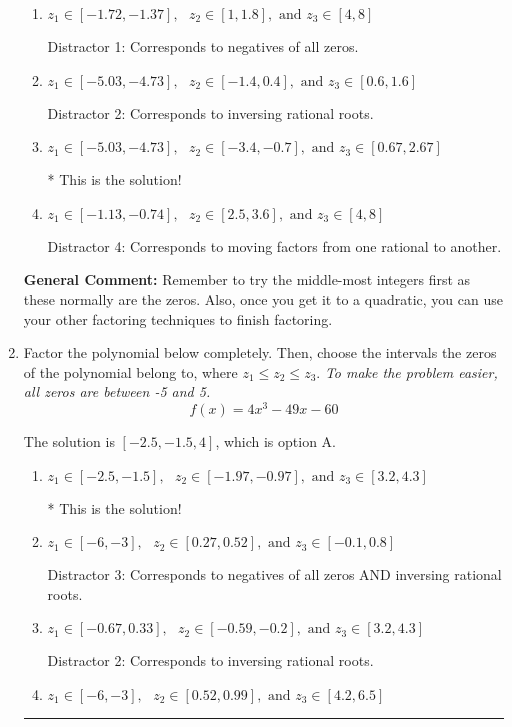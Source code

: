 \documentclass{extbook}[14pt]
\newcommand{\litem}[1]{\item #1

\rule{\textwidth}{0.4pt}}
\begin{document}
\begin{enumerate}
{\begin{enumerate}[label=\Alph*.]
 Distractor 3: Corresponds to negatives of all zeros AND inversing rational roots.
\item \( z_1 \in [-1.72, -1.37], \text{   }  z_2 \in [1, 1.8], \text{   and   } z_3 \in [4, 8] \)

 Distractor 1: Corresponds to negatives of all zeros.
\item \( z_1 \in [-5.03, -4.73], \text{   }  z_2 \in [-1.4, 0.4], \text{   and   } z_3 \in [0.6, 1.6] \)

 Distractor 2: Corresponds to inversing rational roots.
\item \( z_1 \in [-5.03, -4.73], \text{   }  z_2 \in [-3.4, -0.7], \text{   and   } z_3 \in [0.67, 2.67] \)

* This is the solution!
\item \( z_1 \in [-1.13, -0.74], \text{   }  z_2 \in [2.5, 3.6], \text{   and   } z_3 \in [4, 8] \)

 Distractor 4: Corresponds to moving factors from one rational to another.
\end{enumerate}

\textbf{General Comment:} Remember to try the middle-most integers first as these normally are the zeros. Also, once you get it to a quadratic, you can use your other factoring techniques to finish factoring.
}
\litem{
Factor the polynomial below completely. Then, choose the intervals the zeros of the polynomial belong to, where $z_1 \leq z_2 \leq z_3$. \textit{To make the problem easier, all zeros are between -5 and 5.}
\[ f(x) = 4x^{3} -49 x -60 \]

The solution is \( [-2.5, -1.5, 4] \), which is option A.\begin{enumerate}[label=\Alph*.]
\item \( z_1 \in [-2.5, -1.5], \text{   }  z_2 \in [-1.97, -0.97], \text{   and   } z_3 \in [3.2, 4.3] \)

* This is the solution!
\item \( z_1 \in [-6, -3], \text{   }  z_2 \in [0.27, 0.52], \text{   and   } z_3 \in [-0.1, 0.8] \)

 Distractor 3: Corresponds to negatives of all zeros AND inversing rational roots.
\item \( z_1 \in [-0.67, 0.33], \text{   }  z_2 \in [-0.59, -0.2], \text{   and   } z_3 \in [3.2, 4.3] \)

 Distractor 2: Corresponds to inversing rational roots.
\item \( z_1 \in [-6, -3], \text{   }  z_2 \in [0.52, 0.99], \text{   and   } z_3 \in [4.2, 6.5] \)


\end{enumerate}}
\end{enumerate}
\end{document}

